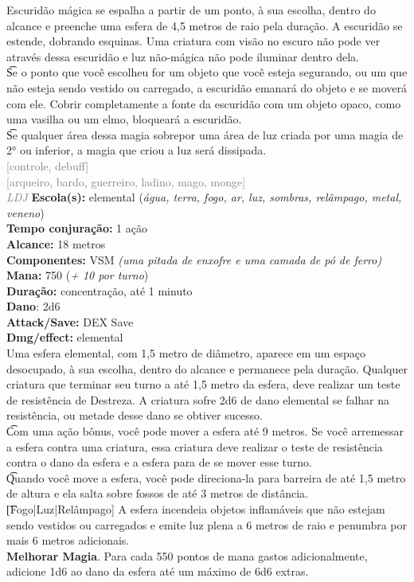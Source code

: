\documentclass{RPG_Adventure}[2021/10/20]
\begin{document}
{\normalsize Escuridão mágica se espalha a partir de um ponto, à sua escolha, dentro do alcance e preenche uma esfera de 4,5 metros de raio pela duração. A escuridão se estende, dobrando esquinas. Uma criatura com visão no escuro não pode ver através dessa escuridão e luz não-mágica não pode iluminar dentro dela.\\\t Se o ponto que você escolheu for um objeto que você esteja segurando, ou um que não esteja sendo vestido ou carregado, a escuridão emanará do objeto e se moverá com ele. Cobrir completamente a fonte da escuridão com um objeto opaco, como uma vasilha ou um elmo, bloqueará a escuridão.\\\t Se qualquer área dessa magia sobrepor uma área de luz criada por uma magia de 2° ou inferior, a magia que criou a luz será dissipada.\\}
{\scriptsize \textcolor{gray}{[controle, debuff]\\}}
{\scriptsize \textcolor{gray}{[arqueiro, bardo, guerreiro, ladino, mago, monge]\\}}
{\tiny \textcolor{gray}{\textit{LDJ}}}\jump{}
{\small \t \textbf{Escola(s):} elemental (\textit{água, terra, fogo, ar, luz, sombras, relâmpago, metal, veneno})\\\t \textbf{Tempo conjuração:} 1 ação\\\t \textbf{Alcance:} 18 metros\\\t \textbf{Componentes:} VSM \textit{(uma pitada de enxofre e uma camada de pó de ferro)}\\\t \textbf{Mana:} 750 (\textit{+ 10 por turno})\\\t \textbf{Duração:} concentração, até 1 minuto\\\t \textbf{Dano}: 2d6\\\t \textbf{Attack/Save:} DEX Save\\\t \textbf{Dmg/effect:} elemental\\}
{\normalsize Uma esfera elemental, com 1,5 metro de diâmetro, aparece em um espaço desocupado, à sua escolha, dentro do alcance e permanece pela duração. Qualquer criatura que terminar seu turno a até 1,5 metro da esfera, deve realizar um teste de resistência de Destreza. A criatura sofre 2d6 de dano elemental se falhar na resistência, ou metade desse dano se obtiver sucesso.\\\t Com uma ação bônus, você pode mover a esfera até 9 metros. Se você arremessar a esfera contra uma criatura, essa criatura deve realizar o teste de resistência contra o dano da esfera e a esfera para de se mover esse turno.\\\t Quando você move a esfera, você pode direciona-la para barreira de até 1,5 metro de altura e ela salta sobre fossos de até 3 metros de distância.\\\t [Fogo|Luz|Relâmpago] A esfera incendeia objetos inflamáveis que não estejam sendo vestidos ou carregados e emite luz plena a 6 metros de raio e penumbra por mais 6 metros adicionais.\\\t \textbf{Melhorar Magia}. Para cada 550 pontos de mana gastos adicionalmente, adicione 1d6 ao dano da esfera até um máximo de 6d6 extras.\\}
\end{document}
